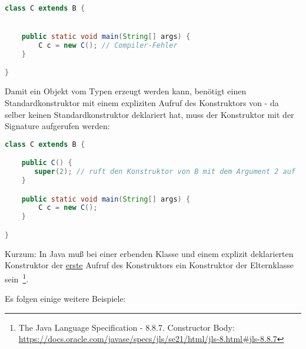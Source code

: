 \begin{lstlisting}[language=java]
class C extends B {


    public static void main(String[] args) {
        C c = new C(); // Compiler-Fehler
    }

}
\end{lstlisting}

Damit ein Objekt vom Typen  erzeugt werden kann, benötigt  einen Standardkonstruktor mit einem expliziten
Aufruf des Konstruktors von  - da  selber keinen Standardkonstruktor deklariert hat, muss der Konstruktor
mit der Signature  aufgerufen werden:

\begin{lstlisting}[language=java]
class C extends B {

    public C() {
       super(2); // ruft den Konstruktor von B mit dem Argument 2 auf
    }

    public static void main(String[] args) {
        C c = new C();
    }

}
\end{lstlisting}

Kurzum: In Java muß bei einer erbenden Klasse und einem explizit deklarierten Konstruktor der \underline{erste} Aufruf
des Konstruktors ein Konstruktor der Elternklasse sein~\footnote{
    The Java Language Specification - 8.8.7. Constructor Body: \url{https://docs.oracle.com/javase/specs/jls/se21/html/jls-8.html#jls-8.8.7}
}.

Es folgen einige weitere Beispiele:

